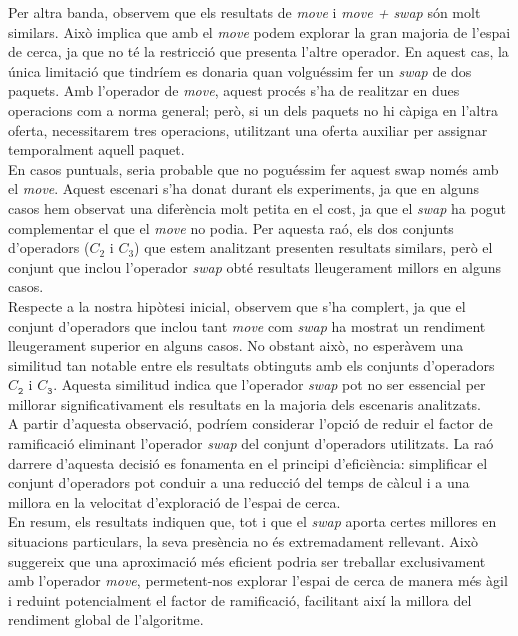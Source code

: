 \documentclass[a4paper]{article}
\begin{document}
	Per altra banda, observem que els resultats de \textit{move} i \textit{move + swap} són molt similars. Això implica que amb el \textit{move} podem explorar la gran majoria de l'espai de cerca, ja que no té la restricció que presenta l'altre operador. En aquest cas, la única limitació que tindríem es donaria quan volguéssim fer un \textit{swap} de dos paquets. Amb l'operador de \textit{move}, aquest procés s'ha de realitzar en dues operacions com a norma general; però, si un dels paquets no hi càpiga en l'altra oferta, necessitarem tres operacions, utilitzant una oferta auxiliar per assignar temporalment aquell paquet. \\
	
	En casos puntuals, seria probable que no poguéssim fer aquest swap només amb el \textit{move}. Aquest escenari s'ha donat durant els experiments, ja que en alguns casos hem observat una diferència molt petita en el cost, ja que el \textit{swap} ha pogut complementar el que el \textit{move} no podia. Per aquesta raó, els dos conjunts d'operadors ($C_2$ i $C_3$) que estem analitzant presenten resultats similars, però el conjunt que inclou l'operador \textit{swap} obté resultats lleugerament millors en alguns casos. \\
	
	Respecte a la nostra hipòtesi inicial, observem que s'ha complert, ja que el conjunt d'operadors que inclou tant \textit{move} com \textit{swap} ha mostrat un rendiment lleugerament superior en alguns casos. No obstant això, no esperàvem una similitud tan notable entre els resultats obtinguts amb els conjunts d'operadors $C_{\texttt{2}}$ i $C_{\texttt{3}}$. Aquesta similitud indica que l'operador \textit{swap} pot no ser essencial per millorar significativament els resultats en la majoria dels escenaris analitzats. \\
	
	A partir d'aquesta observació, podríem considerar l'opció de reduir el factor de ramificació eliminant l'operador \textit{swap} del conjunt d'operadors utilitzats. La raó darrere d'aquesta decisió es fonamenta en el principi d'eficiència: simplificar el conjunt d'operadors pot conduir a una reducció del temps de càlcul i a una millora en la velocitat d'exploració de l'espai de cerca. \\
	
	En resum, els resultats indiquen que, tot i que el \textit{swap} aporta certes millores en situacions particulars, la seva presència no és extremadament rellevant. Això suggereix que una aproximació més eficient podria ser treballar exclusivament amb l'operador \textit{move}, permetent-nos explorar l'espai de cerca de manera més àgil i reduint potencialment el factor de ramificació, facilitant així la millora del rendiment global de l'algoritme.
	
\end{document}
